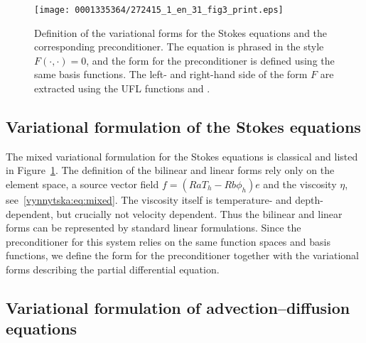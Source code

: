 \begin{figure}[!t]
\texttt{[image: 0001335364/272415\_1\_en\_31\_fig3\_print.eps]}
\caption{Definition of the variational forms for the Stokes
    equations and the corresponding preconditioner. The equation is
    phrased in the style $F(\cdot, \cdot) = 0$, and the form for the
    preconditioner is defined using the same basis functions. The
    left- and right-hand side of the form $F$ are extracted using the
    UFL functions  and .}\label{vynnytska:fig:stokes}\vspace*{-4pt}
\end{figure}



\subsection{Variational formulation of the Stokes equations}

The mixed variational formulation for the Stokes equations is
classical and listed in Figure~\ref{vynnytska:fig:stokes}. The
definition of the bilinear and linear forms rely only on the element space, a
source vector field $f=(Ra T_h - Rb \phi_h)e$ and the viscosity
$\eta$, see~\eqref{vynnytska:eq:mixed}.  The viscosity itself is
temperature- and depth-dependent, but crucially not velocity
dependent.  Thus the bilinear and linear forms can be represented by
standard linear formulations.  Since the preconditioner for this
system relies on the same function spaces and basis functions, we
define the form for the preconditioner together with the variational
forms describing the partial differential equation.


\subsection{Variational formulation of advection--diffusion equations}

